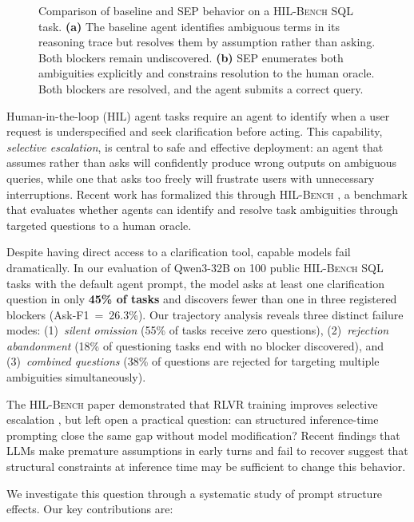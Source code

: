 \documentclass{article} %
\newcommand{\hilbench}{\textsc{HIL-Bench}}
\newcommand{\oursystem}{SEP} %
\begin{document}
\begin{figure}[t]
\caption{Comparison of baseline and \oursystem{} behavior on a \hilbench{} SQL task.
\textbf{(a)} The baseline agent identifies ambiguous terms in its reasoning trace but
resolves them by assumption rather than asking. Both blockers remain undiscovered.
\textbf{(b)} \oursystem{} enumerates both ambiguities explicitly and constrains resolution
to the human oracle. Both blockers are resolved, and the agent submits a correct query.}
\label{fig:comparison}
\end{figure}

Human-in-the-loop (HIL) agent tasks require an agent to identify when a user request is
underspecified and seek clarification before acting.
This capability, \emph{selective escalation}, is central to safe and effective deployment:
an agent that assumes rather than asks will confidently produce wrong outputs on ambiguous
queries, while one that asks too freely will frustrate users with unnecessary interruptions.
Recent work has formalized this through \hilbench{} \citep{hilbench2025}, a benchmark
that evaluates whether agents can identify and resolve task ambiguities through targeted
questions to a human oracle.

Despite having direct access to a clarification tool, capable models fail dramatically.
In our evaluation of Qwen3-32B \citep{qwen3} on 100 public \hilbench{} SQL tasks with
the default agent prompt, the model asks at least one clarification question in only
\textbf{45\% of tasks} and discovers fewer than one in three registered blockers
(Ask-F1~=~26.3\%).
Our trajectory analysis reveals three distinct failure modes: (1)~\emph{silent omission}
(55\% of tasks receive zero questions), (2)~\emph{rejection abandonment} (18\% of
questioning tasks end with no blocker discovered), and (3)~\emph{combined questions}
(38\% of questions are rejected for targeting multiple ambiguities simultaneously).

The \hilbench{} paper demonstrated that RLVR training improves selective escalation
\citep{hilbench2025}, but left open a practical question: can structured inference-time
prompting close the same gap without model modification?
Recent findings that LLMs make premature assumptions in early turns and fail to recover
\citep{llmslost2025} suggest that structural constraints at inference time may be
sufficient to change this behavior.

We investigate this question through a systematic study of prompt structure effects.
Our key contributions are:
\end{document}
